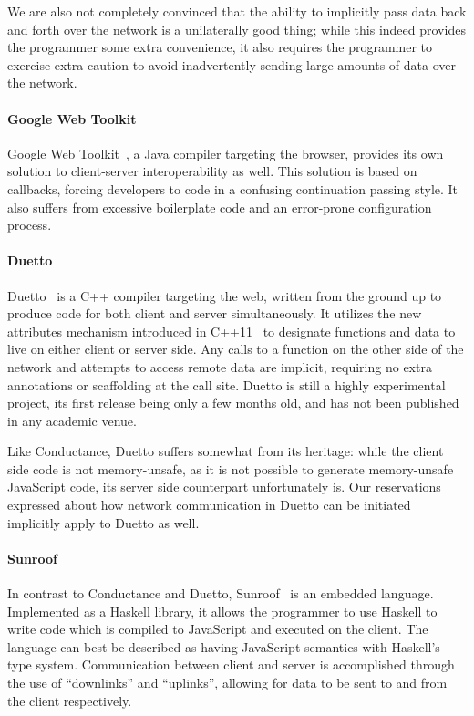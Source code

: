 \documentclass[preprint]{sigplanconf}
\begin{document}
We are also not completely convinced that the ability to implicitly pass data
back and forth over the network is a unilaterally good thing; while this indeed
provides the programmer some extra convenience, it also requires the programmer
to exercise extra caution to avoid inadvertently sending large amounts of data
over the network.

\paragraph{Google Web Toolkit} Google Web Toolkit\ \cite{gwt}, a Java
compiler targeting the browser, provides its own solution to client-server
interoperability as well. This solution is based on callbacks, forcing
developers to code in a confusing continuation passing style. It also suffers
from excessive boilerplate code and an error-prone configuration process.

\paragraph{Duetto} Duetto\ \cite{duetto} is a C++ compiler targeting the web,
written from the ground up to produce code for both client and server
simultaneously.
It utilizes the new attributes mechanism introduced in C++11\ \cite{sepples11}
to designate functions and data to live on either client or server side.
Any calls to a function on the other side of the network and attempts to access
remote data are implicit, requiring no extra annotations or scaffolding at the
call site. Duetto is still a highly experimental project, its first release
being only a few months old, and has not been published in any academic venue.

Like Conductance, Duetto suffers somewhat from its heritage: while the
client side code is not memory-unsafe, as it is not possible to generate
memory-unsafe JavaScript code, its server side counterpart unfortunately is.
Our reservations expressed about how network communication in Duetto can be
initiated implicitly apply to Duetto as well.

\paragraph{Sunroof} In contrast to Conductance and Duetto,
Sunroof\ \cite{sunroof} is an embedded language. Implemented as a Haskell
library, it allows the programmer to use Haskell to write code which is
compiled to JavaScript and executed on the client. The language can best be
described as having JavaScript semantics with Haskell's type system.
Communication between client and server is accomplished through the use
of ``downlinks'' and ``uplinks'', allowing for data to be sent to and from the
client respectively.
\end{document}
